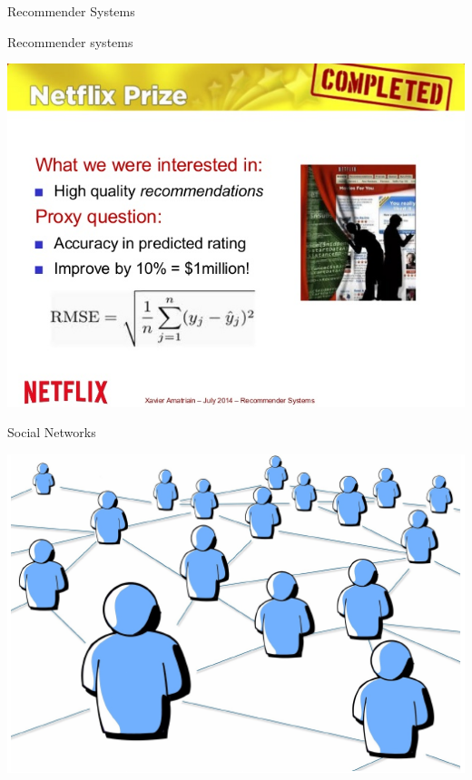 \documentclass{beamer}
\begin{document}
\begin{frame}{Recommender Systems}

Recommender systems

\begin{center}
\includegraphics[width=.7\textwidth]{figs/recommender-systems}
\end{center}

\end{frame}

\begin{frame}{Social Networks}

\begin{center}
\includegraphics[width=.8\textwidth]{figs/SocialNetworks}
\end{center}

\end{frame}
\end{document}
